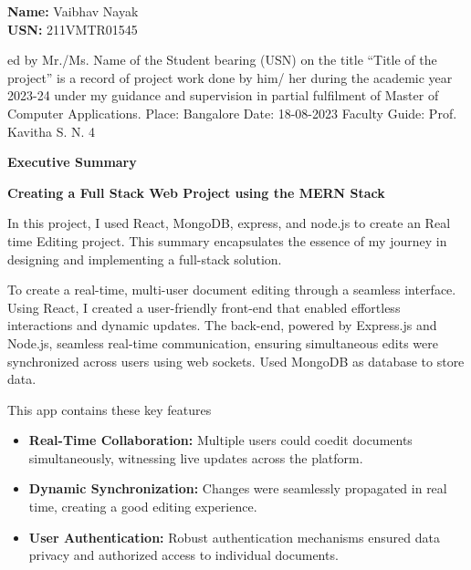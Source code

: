 \documentclass{article}
\begin{document}
\vspace{25pt}


\hfill %
\begin{minipage}[t]{0.45\linewidth}
    \raggedleft %
   {\bfseries Name:} Vaibhav Nayak \\
    {\bfseries USN:} 211VMTR01545
\end{minipage}ed by Mr./Ms. Name of the
Student bearing (USN) on the title “Title of the project” is a record of project
work done by him/ her during the academic year 2023-24 under my guidance and
supervision in partial fulfilment of Master of Computer Applications.
Place: Bangalore
Date: 18-08-2023
Faculty Guide: Prof. Kavitha S. N.
4


\newpage
\begin{center}
    \LARGE\bfseries Executive Summary \\
\end{center}

\vspace{25pt}

{\Large\bfseries Creating a Full Stack Web Project using the MERN Stack \\}

{\large In this project, I used React, MongoDB, express, and node.js to create an Real time Editing project. This summary encapsulates the essence of my journey in designing and implementing a full-stack solution.}

\vspace{10pt}

{\large  To create a real-time, multi-user document editing through a seamless
interface. Using React, I created a user-friendly front-end that enabled effortless
interactions and dynamic updates. The back-end, powered by Express.js and Node.js,
seamless real-time communication, ensuring simultaneous edits were synchronized across
users using web sockets. Used MongoDB as database to store data.
}

\vspace{10pt}

{\large This app contains these key features}

\begin{itemize}
    \item {\bfseries Real-Time Collaboration:} Multiple users could coedit documents simultaneously, witnessing live updates across the platform.
    \item {\bfseries Dynamic Synchronization:} Changes were seamlessly propagated in real time, creating a good editing experience.
    \item {\bfseries User Authentication:} Robust authentication mechanisms ensured data privacy and authorized access to individual documents.
    
\end{itemize}
\end{document}
